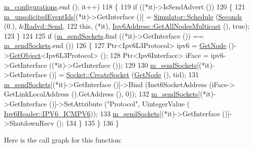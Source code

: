 \begin{DoxyCode}
      \hyperlink{classns3_1_1Radvd_ad47ced3406790e0b78b5b141e0568aa9}{m\_configurations}.end (); it++)
118     \{
119       \textcolor{keywordflow}{if} ((*it)->IsSendAdvert ())
120         \{
121           \hyperlink{classns3_1_1Radvd_aa214a58cd8ed1b693a177e9611b88177}{m\_unsolicitedEventIds}[(*it)->GetInterface ()] = 
      \hyperlink{classns3_1_1Simulator_a671882c894a08af4a5e91181bf1eec13}{Simulator::Schedule} (\hyperlink{group__timecivil_ga33c34b816f8ff6628e33d5c8e9713b9e}{Seconds} (0.), &\hyperlink{classns3_1_1Radvd_a2dc4914b58690eaef190f38726d69bb2}{Radvd::Send},
122                                                                                \textcolor{keyword}{this}, (*it), 
      \hyperlink{classns3_1_1Ipv6Address_a11e6e4228d3d6e814b2c5ffc18c8ed20}{Ipv6Address::GetAllNodesMulticast} (), \textcolor{keyword}{true});
123         \}
124 
125       \textcolor{keywordflow}{if} (\hyperlink{classns3_1_1Radvd_ab0bd7a7d72f1ec0909ec447bcdf4788e}{m\_sendSockets}.find ((*it)->GetInterface ()) == 
      \hyperlink{classns3_1_1Radvd_ab0bd7a7d72f1ec0909ec447bcdf4788e}{m\_sendSockets}.end ())
126         \{
127           Ptr<Ipv6L3Protocol> ipv6 = \hyperlink{classns3_1_1Application_a664b15088389bec8e35b35742138f097}{GetNode} ()->\hyperlink{classns3_1_1Object_a13e18c00017096c8381eb651d5bd0783}{GetObject}<Ipv6L3Protocol> ();
128           Ptr<Ipv6Interface> iFace = ipv6->GetInterface ((*it)->GetInterface ());
129 
130           \hyperlink{classns3_1_1Radvd_ab0bd7a7d72f1ec0909ec447bcdf4788e}{m\_sendSockets}[(*it)->GetInterface ()] = 
      \hyperlink{classns3_1_1Socket_ad448a62bb50ad3dbac59c879a885a8d2}{Socket::CreateSocket} (\hyperlink{classns3_1_1Application_a664b15088389bec8e35b35742138f097}{GetNode} (), tid);
131           \hyperlink{classns3_1_1Radvd_ab0bd7a7d72f1ec0909ec447bcdf4788e}{m\_sendSockets}[(*it)->GetInterface ()]->Bind (Inet6SocketAddress (iFace->
      GetLinkLocalAddress ().GetAddress (), 0));
132           \hyperlink{classns3_1_1Radvd_ab0bd7a7d72f1ec0909ec447bcdf4788e}{m\_sendSockets}[(*it)->GetInterface ()]->SetAttribute (\textcolor{stringliteral}{"Protocol"}, UintegerValue (
      \hyperlink{classns3_1_1Ipv6Header_a226429221a066c5e3b1f260caf27d1e9a5a1ba2c977ece2a8089761a3bd2e5478}{Ipv6Header::IPV6\_ICMPV6}));
133           \hyperlink{classns3_1_1Radvd_ab0bd7a7d72f1ec0909ec447bcdf4788e}{m\_sendSockets}[(*it)->GetInterface ()]->ShutdownRecv ();
134         \}
135     \}
136 \}
\end{DoxyCode}


Here is the call graph for this function\+:


